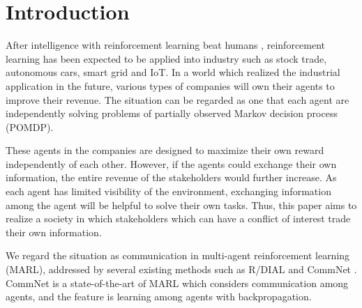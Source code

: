 \section{Introduction}

After intelligence with reinforcement learning beat humans \citep{tesauro1995temporal,mnih2015human,silver2016mastering}, reinforcement learning has been expected to be applied into industry such as stock trade, autonomous cars, smart grid and IoT. 
In a world which realized the industrial application in the future, various types of companies will own their agents to improve their revenue.
The situation can be regarded as one that each agent are independently solving problems of partially observed Markov decision process (POMDP).

These agents in the companies are designed to maximize their own reward independently of each other. 
However, if the agents could exchange their own information, the entire revenue of the stakeholders would further increase.
As each agent has limited visibility of the environment, exchanging information among the agent will be helpful to solve their own tasks.
Thus, this paper aims to realize a society in which stakeholders which can have a conflict of interest trade their own information.


We regard the situation as communication in multi-agent reinforcement learning (MARL), addressed by several existing methods such as R/DIAL \citep{foerster2016learning} and CommNet \citep{sukhbaatar2016learning}.
CommNet is a state-of-the-art of MARL which considers communication among agents, 
and the feature is learning among agents with backpropagation.

